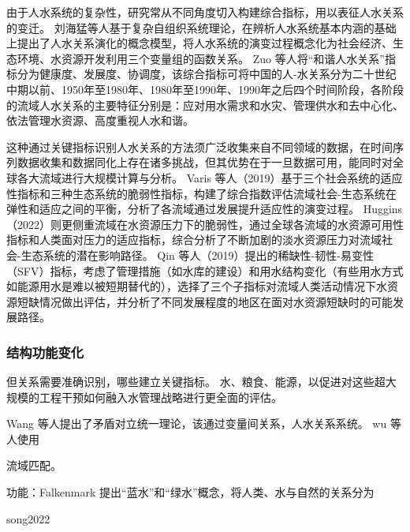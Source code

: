 由于人水系统的复杂性，研究常从不同角度切入构建综合指标，用以表征人水关系的变迁。
刘海猛等人基于复杂自组织系统理论，在辨析人水系统基本内涵的基础上提出了人水关系演化的概念模型，将人水系统的演变过程概念化为社会经济、生态环境、水资源开发利用三个变量组的函数关系\cite{liu2014}。
Zuo 等人将“和谐人水关系”指标分为健康度、发展度、协调度\cite{zuo2008}，该综合指标可将中国的人-水关系分为二十世纪中期以前、1950年至1980年、1980年至1990年、1990年之后四个时间阶段，各阶段的流域人水关系的主要特征分别是：应对用水需求和水灾、管理供水和去中心化、依法管理水资源、高度重视人水和谐\cite{zuo2016a}。

这种通过关键指标识别人水关系的方法须广泛收集来自不同领域的数据，在时间序列数据收集和数据同化上存在诸多挑战，但其优势在于一旦数据可用，能同时对全球各大流域进行大规模计算与分析。
Varis 等人（2019）基于三个社会系统的适应性指标和三种生态系统的脆弱性指标，构建了综合指数评估流域社会-生态系统在弹性和适应之间的平衡，分析了各流域通过发展提升适应性的演变过程\cite{varis2019}。
Huggins（2022）则更侧重流域在水资源压力下的脆弱性，通过全球各流域的水资源可用性指标和人类面对压力的适应指标，综合分析了不断加剧的淡水资源压力对流域社会-生态系统的潜在影响路径\cite{huggins2022}。
Qin 等人（2019）提出的稀缺性-韧性-易变性（SFV）指标，考虑了管理措施（如水库的建设）和用水结构变化（有些用水方式如能源用水是难以被短期替代的），选择了三个子指标对流域人类活动情况下水资源短缺情况做出评估，并分析了不同发展程度的地区在面对水资源短缺时的可能发展路径\cite{qin2019}。

\subsubsection*{结构功能变化}
但关系需要准确识别，哪些建立关键指标。
水、粮食、能源，以促进对这些超大规模的工程干预如何融入水管理战略进行更全面的评估。\cite{rollason2021}

Wang 等人提出了矛盾对立统一理论，该通过变量间关系，人水关系系统\cite{wang2017}。
wu 等人使用\cite{wu2020a}

流域匹配\cite{sayles2017}。

功能：Falkenmark 提出“蓝水”和“绿水”概念，将人类、水与自然的关系分为

song2022